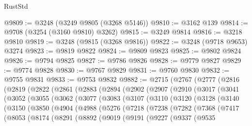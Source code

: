 \begin{lexlean}{RustStd}
\begin{coremodule}
@9809 := @3248 (@3249 @9805 (@3268 @5146))
@9810 := @3162 @139
@9814 := @9708 (@3254 (@3160 @9810) @3262)
@9815 := @3249 @9814
@9816 := @3218 @9810
@9819 := @3248 (@9815 (@3268 @9816))
@9822 := @3248 (@9718 @9653) @3274
@9823 := @9819 @9822
@9824 := @9809 @9823
@9825 := @9802 @9824
@9826 := @9794 @9825
@9827 := @9786 @9826
@9828 := @9779 @9827
@9829 := @9774 @9828
@9830 := @9767 @9829
@9831 := @9760 @9830
@9832 := @9755 @9831
@9833 := @9753 @9832
@9882 := @2715
    (@2767
      (@2777
        (@2816
          (@2819
            (@2822
              (@2861
                (@2883
                  (@2894
                    (@2902
                      (@2907
                        (@2910
                          (@3017
                            (@3041
                              (@3052
                                (@3055
                                  (@3062
                                    (@3077
                                      (@3083
                                        (@3107
                                          (@3110
                                            (@3120
                                              (@3128
                                                (@3140
                                                  (@3150
                                                    (@3850
                                                      (@4904
                                                        (@4988
                                                          (@5276
                                                            (@7218
                                                              (@7238
                                                                (@7282
                                                                  (@7368
                                                                    (@7417
                                                                      (@8053
                                                                        (@8174
                                                                          (@8291
                                                                            (@8892
                                                                              (@9019
                                                                                (@9191
                                                                                  (@9227
                                                                                    (@9337
                                                                                      (@9535

\end{coremodule}
\end{lexlean}
